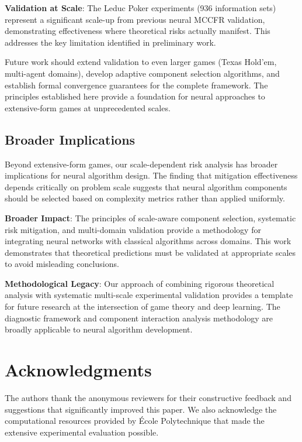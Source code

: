 \documentclass[12pt,a4paper]{article}
\begin{document}
\textbf{Validation at Scale}: The Leduc Poker experiments (936 information sets) represent a significant scale-up from previous neural MCCFR validation, demonstrating effectiveness where theoretical risks actually manifest. This addresses the key limitation identified in preliminary work.

Future work should extend validation to even larger games (Texas Hold'em, multi-agent domains), develop adaptive component selection algorithms, and establish formal convergence guarantees for the complete framework. The principles established here provide a foundation for neural approaches to extensive-form games at unprecedented scales.

\subsection{Broader Implications}

Beyond extensive-form games, our scale-dependent risk analysis has broader implications for neural algorithm design. The finding that mitigation effectiveness depends critically on problem scale suggests that neural algorithm components should be selected based on complexity metrics rather than applied uniformly.

\textbf{Broader Impact}: The principles of scale-aware component selection, systematic risk mitigation, and multi-domain validation provide a methodology for integrating neural networks with classical algorithms across domains. This work demonstrates that theoretical predictions must be validated at appropriate scales to avoid misleading conclusions.

\textbf{Methodological Legacy}: Our approach of combining rigorous theoretical analysis with systematic multi-scale experimental validation provides a template for future research at the intersection of game theory and deep learning. The diagnostic framework and component interaction analysis methodology are broadly applicable to neural algorithm development.

\section*{Acknowledgments}

The authors thank the anonymous reviewers for their constructive feedback and suggestions that significantly improved this paper. We also acknowledge the computational resources provided by École Polytechnique that made the extensive experimental evaluation possible.
\end{document}
